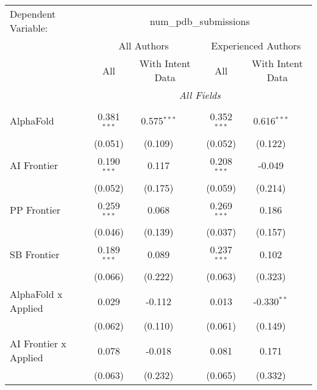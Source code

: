 \begingroup
\centering
\begin{tabular}{lcccccc}
   \tabularnewline \midrule \midrule
   Dependent Variable: & \multicolumn{6}{c}{num\_pdb\_submissions}\\
 & \multicolumn{3}{c}{All Authors} & \multicolumn{3}{c}{Experienced Authors} \\
\cmidrule(lr){2-4} \cmidrule(lr){5-7}
 & \multicolumn{1}{c}{All} & \multicolumn{2}{c}{With Intent Data} & \multicolumn{1}{c}{All} & \multicolumn{2}{c}{With Intent Data} \\
\cmidrule(lr){2-2} \cmidrule(lr){3-4} \cmidrule(lr){5-5} \cmidrule(lr){6-7}
 & \multicolumn{6}{c}{\textit{All Fields}} \\ \\
   AlphaFold                      & 0.381$^{***}$  & 0.575$^{***}$ &               & 0.352$^{***}$  & 0.616$^{***}$ &   \\   
                                  & (0.051)        & (0.109)       &               & (0.052)        & (0.122)       &   \\   
   AI Frontier                    & 0.190$^{***}$  & 0.117         &               & 0.208$^{***}$  & -0.049        &   \\   
                                  & (0.052)        & (0.175)       &               & (0.059)        & (0.214)       &   \\   
   PP Frontier                    & 0.259$^{***}$  & 0.068         &               & 0.269$^{***}$  & 0.186         &   \\   
                                  & (0.046)        & (0.139)       &               & (0.037)        & (0.157)       &   \\   
   SB Frontier                    & 0.189$^{***}$  & 0.089         &               & 0.237$^{***}$  & 0.102         &   \\   
                                  & (0.066)        & (0.222)       &               & (0.063)        & (0.323)       &   \\   
   AlphaFold x Applied            & 0.029          & -0.112        &               & 0.013          & -0.330$^{**}$ &   \\   
                                  & (0.062)        & (0.110)       &               & (0.061)        & (0.149)       &   \\   
   AI Frontier x Applied          & 0.078          & -0.018        &               & 0.081          & 0.171         &   \\   
                                  & (0.063)        & (0.232)       &               & (0.065)        & (0.332)       &   \\   

\end{tabular}
